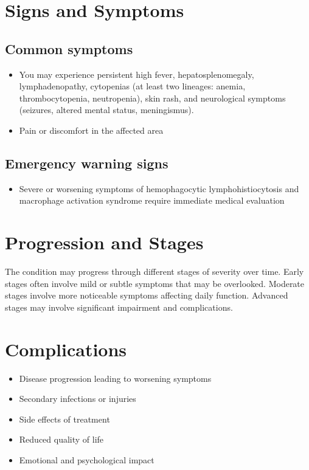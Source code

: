 \section{Signs and Symptoms}

\subsection{Common symptoms}
\begin{itemize}[noitemsep]
  \item You may experience persistent high fever, hepatosplenomegaly, lymphadenopathy, cytopenias (at least two lineages: anemia, thrombocytopenia, neutropenia), skin rash, and neurological symptoms (seizures, altered mental status, meningismus).

  \item Pain or discomfort in the affected area
  \end{itemize}

\subsection{Emergency warning signs}
\begin{itemize}[noitemsep]
  \item Severe or worsening symptoms of hemophagocytic lymphohistiocytosis and macrophage activation syndrome require immediate medical evaluation
\end{itemize}
\section{Progression and Stages}
The condition may progress through different stages of severity over time. Early stages often involve mild or subtle symptoms that may be overlooked. Moderate stages involve more noticeable symptoms affecting daily function. Advanced stages may involve significant impairment and complications.
\section{Complications}
\begin{itemize}[noitemsep]
  \item Disease progression leading to worsening symptoms
  \item Secondary infections or injuries
  \item Side effects of treatment
  \item Reduced quality of life
  \item Emotional and psychological impact
\end{itemize}
